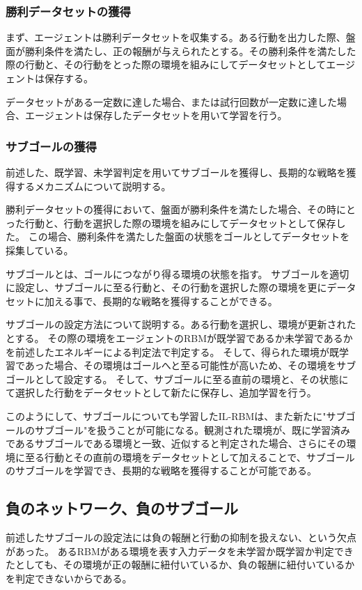 \subsubsection{勝利データセットの獲得}
まず、エージェントは勝利データセットを収集する。ある行動を出力した際、盤面が勝利条件を満たし、正の報酬が与えられたとする。その勝利条件を満たした際の行動と、その行動をとった際の環境を組みにしてデータセットとしてエージェントは保存する。

データセットがある一定数に達した場合、または試行回数が一定数に達した場合、エージェントは保存したデータセットを用いて学習を行う。

\subsubsection{サブゴールの獲得}
前述した、既学習、未学習判定を用いてサブゴールを獲得し、長期的な戦略を獲得するメカニズムについて説明する。

勝利データセットの獲得において、盤面が勝利条件を満たした場合、その時にとった行動と、行動を選択した際の環境を組みにしてデータセットとして保存した。
この場合、勝利条件を満たした盤面の状態をゴールとしてデータセットを採集している。

サブゴールとは、ゴールにつながり得る環境の状態を指す。
サブゴールを適切に設定し、サブゴールに至る行動と、その行動を選択した際の環境を更にデータセットに加える事で、長期的な戦略を獲得することができる。

サブゴールの設定方法について説明する。ある行動を選択し、環境が更新されたとする。
その際の環境をエージェントのRBMが既学習であるか未学習であるかを前述したエネルギーによる判定法で判定する。
そして、得られた環境が既学習であった場合、その環境はゴールへと至る可能性が高いため、その環境をサブゴールとして設定する。
そして、サブゴールに至る直前の環境と、その状態にて選択した行動をデータセットとして新たに保存し、追加学習を行う。

このようにして、サブゴールについても学習したIL-RBMは、また新たに"サブゴールのサブゴール"を扱うことが可能になる。観測された環境が、既に学習済みであるサブゴールである環境と一致、近似すると判定された場合、さらにその環境に至る行動とその直前の環境をデータセットとして加えることで、サブゴールのサブゴールを学習でき、長期的な戦略を獲得することが可能である。

\subsection{負のネットワーク、負のサブゴール}
前述したサブゴールの設定法には負の報酬と行動の抑制を扱えない、という欠点があった。
あるRBMがある環境を表す入力データを未学習か既学習か判定できたとしても、その環境が正の報酬に紐付いているか、負の報酬に紐付いているかを判定できないからである。

